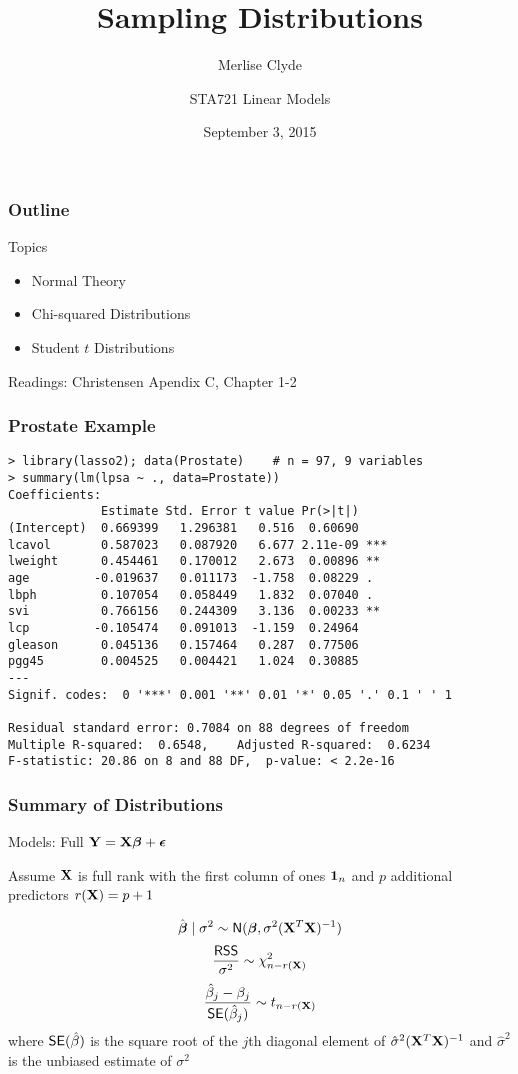\documentclass[handout]{beamer}
\title{Sampling Distributions}
\subtitle{Merlise Clyde}
\author{STA721 Linear Models}
\institute{Duke University}
\date{September 3, 2015}
\begin{document}
\maketitle

\begin{frame}\frametitle{Outline}
Topics 
  \begin{itemize}
  \item Normal Theory
  \item Chi-squared Distributions
  \item Student $t$ Distributions
  \end{itemize}

\vspace{24pt}
Readings:  Christensen Apendix C, Chapter 1-2 
\end{frame}

\begin{frame}[fragile]
  \frametitle{Prostate Example}
  \begin{small}
\begin{verbatim}
> library(lasso2); data(Prostate)    # n = 97, 9 variables
> summary(lm(lpsa ~ ., data=Prostate))
Coefficients:
             Estimate Std. Error t value Pr(>|t|)    
(Intercept)  0.669399   1.296381   0.516  0.60690    
lcavol       0.587023   0.087920   6.677 2.11e-09 ***
lweight      0.454461   0.170012   2.673  0.00896 ** 
age         -0.019637   0.011173  -1.758  0.08229 .  
lbph         0.107054   0.058449   1.832  0.07040 .  
svi          0.766156   0.244309   3.136  0.00233 ** 
lcp         -0.105474   0.091013  -1.159  0.24964    
gleason      0.045136   0.157464   0.287  0.77506    
pgg45        0.004525   0.004421   1.024  0.30885    
---
Signif. codes:  0 '***' 0.001 '**' 0.01 '*' 0.05 '.' 0.1 ' ' 1

Residual standard error: 0.7084 on 88 degrees of freedom
Multiple R-squared:  0.6548,	Adjusted R-squared:  0.6234 
F-statistic: 20.86 on 8 and 88 DF,  p-value: < 2.2e-16
\end{verbatim}
    
\end{small}

\end{frame}

\begin{frame}
  \frametitle{Summary of Distributions}

Models:  Full  $\mathbf{Y} = \mathbf{X}\boldsymbol{\beta} + \boldsymbol{\epsilon}$ 

Assume $\mathbf{X}$ is full rank with the first column of ones $\mathbf{1}_n$ and $p$ additional predictors $r(\mathbf{X}) = p +1$

   $$\hat{\boldsymbol{\beta}} \mid \sigma^2 \sim \textsf{N}(\boldsymbol{\beta}, \sigma^2 (\mathbf{X}^T\mathbf{X})^{-1})$$
   $$\frac{\textsf{RSS} }{\sigma^2} \sim \chi^2_{n - r(\mathbf{X})}$$
   $$\frac{\hat{\beta}_j - \beta_j}{\textsf{SE}(\hat{\beta}_j)} \sim t_{n - r(\mathbf{X})}$$
where  $\textsf{SE}(\hat{\beta})$  is the square root of the  $j$th diagonal element of $\hat{\sigma}^2 (\mathbf{X}^T\mathbf{X})^{-1}$   and $\hat{\sigma}^2$ is the unbiased estimate of $\sigma^2$
\end{frame}
\end{document}
